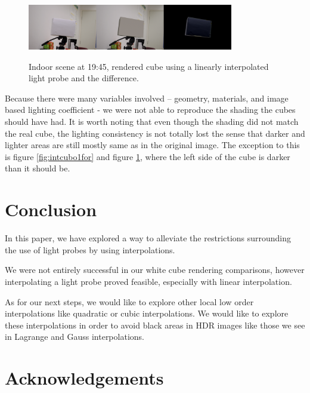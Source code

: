\documentclass[conference]{acmsiggraph}
\begin{document}
	\begin{figure}[!ht]
		\caption{Indoor scene at 19:45, rendered cube using a linearly interpolated light probe and the difference.}
		\centering
		\includegraphics[width=9cm]{images/intcubo1lin.png}
		\label{fig:intcubo1lin}
	\end{figure}



	Because there were many variables involved – geometry, materials, and image based lighting coefficient - we were not able to reproduce the shading the cubes should have had. It is worth noting that even though the shading did not match the real cube, the lighting consistency is not totally lost the sense that darker and lighter areas are still mostly same as in the original image. The exception to this is figure \ref{fig:intcubo1for} and figure \ref{fig:intcubo1lin}, where the left side of the cube is darker than it should be.

\section{Conclusion}

In this paper, we have explored a way to alleviate the restrictions surrounding the use of light probes by using interpolations. 

We were not entirely successful in our white cube rendering comparisons, however interpolating a light probe proved feasible, especially with linear interpolation.

As for our next steps, we would like to explore other local low order interpolations like quadratic or cubic interpolations. We would like to explore these interpolations in order to avoid black areas in HDR images like those we see in Lagrange and Gauss interpolations.


\section*{Acknowledgements}



\end{document}
